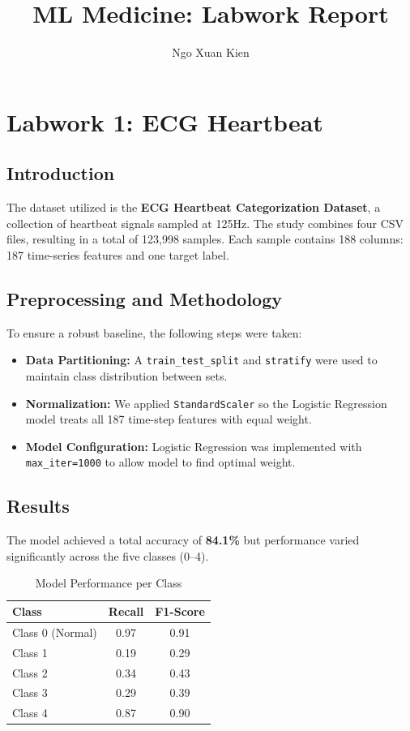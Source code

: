 \documentclass[conference]{IEEEtran}
\title{ML Medicine: Labwork Report}
\author{Ngo Xuan Kien}
\begin{document}
\maketitle

\section{Labwork 1: ECG Heartbeat}

\subsection{Introduction}

The dataset utilized is the \textbf{ECG Heartbeat Categorization Dataset}, a collection of heartbeat signals sampled at 125Hz. The study combines four CSV files, resulting in a total of 123,998 samples. Each sample contains 188 columns: 187 time-series features and one target label.

\subsection{Preprocessing and Methodology}

To ensure a robust baseline, the following steps were taken:

\begin{itemize}
    \item \textbf{Data Partitioning:} A \texttt{train\_test\_split} and \texttt{stratify} were used to maintain class distribution between sets.
    \item \textbf{Normalization:} We applied \texttt{StandardScaler} so the Logistic Regression model treats all 187 time-step features with equal weight.
    \item \textbf{Model Configuration:} Logistic Regression was implemented with \texttt{max\_iter=1000} to allow model to find optimal weight.
\end{itemize}

\subsection{Results}

The model achieved a total accuracy of \textbf{84.1\%} but performance varied significantly across the five classes (0--4).

\begin{table}[h]
\centering
\caption{Model Performance per Class}
\begin{tabular}{lcc}
\toprule
\textbf{Class} & \textbf{Recall} & \textbf{F1-Score} \\ \midrule
Class 0 (Normal) & 0.97 & 0.91 \\
Class 1 & 0.19 & 0.29 \\
Class 2 & 0.34 & 0.43 \\
Class 3 & 0.29 & 0.39 \\
Class 4 & 0.87 & 0.90 \\ \bottomrule
\end{tabular}
\end{table}
\end{document}
